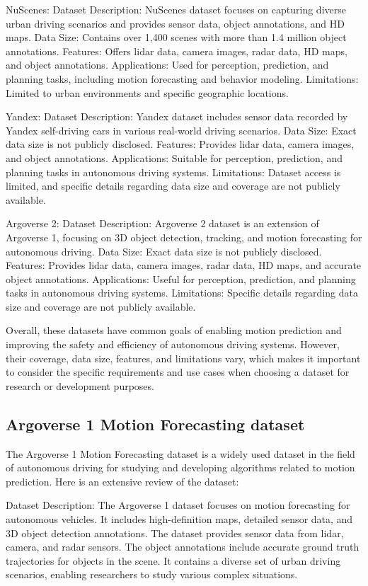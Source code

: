 NuScenes:
Dataset Description: NuScenes dataset focuses on capturing diverse urban driving scenarios and provides sensor data, object annotations, and HD maps.
Data Size: Contains over 1,400 scenes with more than 1.4 million object annotations.
Features: Offers lidar data, camera images, radar data, HD maps, and object annotations.
Applications: Used for perception, prediction, and planning tasks, including motion forecasting and behavior modeling.
Limitations: Limited to urban environments and specific geographic locations.

Yandex:
Dataset Description: Yandex dataset includes sensor data recorded by Yandex self-driving cars in various real-world driving scenarios.
Data Size: Exact data size is not publicly disclosed.
Features: Provides lidar data, camera images, and object annotations.
Applications: Suitable for perception, prediction, and planning tasks in autonomous driving systems.
Limitations: Dataset access is limited, and specific details regarding data size and coverage are not publicly available.

Argoverse 2:
Dataset Description: Argoverse 2 dataset is an extension of Argoverse 1, focusing on 3D object detection, tracking, and motion forecasting for autonomous driving.
Data Size: Exact data size is not publicly disclosed.
Features: Provides lidar data, camera images, radar data, HD maps, and accurate object annotations.
Applications: Useful for perception, prediction, and planning tasks in autonomous driving systems.
Limitations: Specific details regarding data size and coverage are not publicly available.

Overall, these datasets have common goals of enabling motion prediction and improving the safety and efficiency of autonomous driving systems. However, their coverage, data size, features, and limitations vary, which makes it important to consider the specific requirements and use cases when choosing a dataset for research or development purposes.

\subsection{Argoverse 1 Motion Forecasting dataset}
\label{subsec:5_argoverse_1}

The Argoverse 1 Motion Forecasting dataset is a widely used dataset in the field of autonomous driving for studying and developing algorithms related to motion prediction. Here is an extensive review of the dataset:

Dataset Description:
The Argoverse 1 dataset focuses on motion forecasting for autonomous vehicles.
It includes high-definition maps, detailed sensor data, and 3D object detection annotations.
The dataset provides sensor data from lidar, camera, and radar sensors.
The object annotations include accurate ground truth trajectories for objects in the scene.
It contains a diverse set of urban driving scenarios, enabling researchers to study various complex situations.

